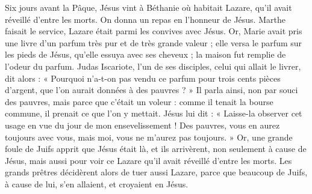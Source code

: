 Six jours avant la Pâque, Jésus vint à Béthanie où habitait Lazare, qu’il avait réveillé d’entre les morts.
On donna un repas en l’honneur de Jésus. Marthe faisait le service, Lazare était parmi les convives avec Jésus.
Or, Marie avait pris une livre d’un parfum très pur et de très grande valeur ; elle versa le parfum sur les pieds de Jésus, qu’elle essuya avec ses cheveux ; la maison fut remplie de l’odeur du parfum.
Judas Iscariote, l’un de ses disciples, celui qui allait le livrer, dit alors :
« Pourquoi n’a-t-on pas vendu ce parfum pour trois cents pièces d’argent, que l’on aurait données à des pauvres ? »
Il parla ainsi, non par souci des pauvres, mais parce que c’était un voleur : comme il tenait la bourse commune, il prenait ce que l’on y mettait.
Jésus lui dit : « Laisse-la observer cet usage en vue du jour de mon ensevelissement !
Des pauvres, vous en aurez toujours avec vous, mais moi, vous ne m’aurez pas toujours. »
Or, une grande foule de Juifs apprit que Jésus était là, et ils arrivèrent, non seulement à cause de Jésus, mais aussi pour voir ce Lazare qu’il avait réveillé d’entre les morts.
Les grands prêtres décidèrent alors de tuer aussi Lazare,
parce que beaucoup de Juifs, à cause de lui, s’en allaient, et croyaient en Jésus.
